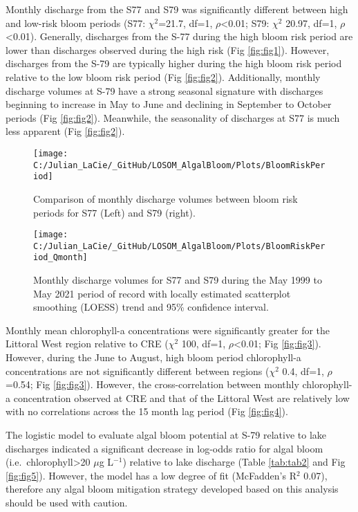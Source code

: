 \documentclass[]{interact}
\theoremstyle{plain}%
\theoremstyle{definition}
\theoremstyle{remark}
\begin{document}
Monthly discharge from the S77 and S79 was significantly different
between high and low-risk bloom periods (S77: \(\chi^{2}\)=21.7, df=1,
\(\rho\)\textless0.01; S79: \(\chi^{2}\) 20.97, df=1,
\(\rho\)\textless0.01). Generally, discharges from the S-77 during the
high bloom risk period are lower than discharges observed during the
high risk (Fig \ref{fig:fig1}). However, discharges from the S-79 are
typically higher during the high bloom risk period relative to the low
bloom risk period (Fig \ref{fig:fig2}). Additionally, monthly discharge
volumes at S-79 have a strong seasonal signature with discharges
beginning to increase in May to June and declining in September to
October periods (Fig \ref{fig:fig2}). Meanwhile, the seasonality of
discharges at S77 is much less apparent (Fig \ref{fig:fig2}).

\begin{figure}[H]
\texttt{[image: C:/Julian\_LaCie/\_GitHub/LOSOM\_AlgalBloom/Plots/BloomRiskPeriod]} \caption{\label{fig:fig1} Comparison of monthly discharge volumes between bloom risk periods for S77 (Left) and S79 (right).}\label{fig:unnamed-chunk-3}
\end{figure}

\begin{figure}[H]
\texttt{[image: C:/Julian\_LaCie/\_GitHub/LOSOM\_AlgalBloom/Plots/BloomRiskPeriod\_Qmonth]} \caption{\label{fig:fig2} Monthly discharge volumes for S77 and S79 during the May 1999 to May 2021 period of record with locally estimated scatterplot smoothing (LOESS) trend and 95\% confidence interval.}\label{fig:unnamed-chunk-4}
\end{figure}

Monthly mean chlorophyll-a concentrations were significantly greater for
the Littoral West region relative to CRE (\(\chi^{2}\) 100, df=1,
\(\rho\)\textless0.01; Fig \ref{fig:fig3}). However, during the June to
August, high bloom period chlorophyll-a concentrations are not
significantly different between regions (\(\chi^{2}\) 0.4, df=1,
\(\rho\)=0.54; Fig \ref{fig:fig3}). However, the cross-correlation
between monthly chlorophyll-a concentration observed at CRE and that of
the Littoral West are relatively low with no correlations across the 15
month lag period (Fig \ref{fig:fig4}).

The logistic model to evaluate algal bloom potential at S-79 relative to
lake discharges indicated a significant decrease in log-odds ratio for
algal bloom (i.e.~chlorophyll\textgreater20 \(\mu\)g L\(^{-1}\))
relative to lake discharge (Table \ref{tab:tab2} and Fig
\ref{fig:fig5}). However, the model has a low degree of fit (McFadden's
R\(^{2}\) 0.07), therefore any algal bloom mitigation strategy developed
based on this analysis should be used with caution.
\end{document}
